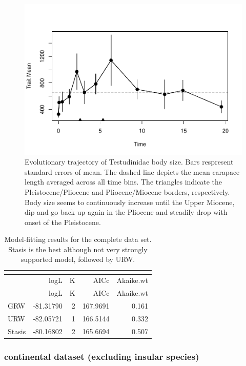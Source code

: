 \begin{figure}[H]
	\centering
	\includegraphics{MA_JJ_files/figure-latex/paleoTSAll-1.pdf}
	\caption[PaleoTS plot of complete data set]{Evolutionary trajectory of Testudinidae body size. Bars respresent standard errors of mean. The dashed line depicts the mean carapace length averaged across all time bins. The triangles indicate the Pleistocene/Pliocene and Pliocene/Miocene borders, respectively. Body size seems to continuously increase until the Upper Miocene, dip and go back up again in the Pliocene and steadily drop with onset of the Pleistocene.}
	\label{fig:pTSall}
\end{figure}

\begin{longtable}[]{@{}lrrrr@{}}
	\caption[Model fits for complete data set]{Model-fitting results for the complete data set. Stasis is the best although not very strongly supported model, followed by URW.}
	\label{tab:pTSallEM}\tabularnewline
	\toprule
	& logL & K & AICc & Akaike.wt\tabularnewline
	\midrule
	\endfirsthead
	\toprule
	& logL & K & AICc & Akaike.wt\tabularnewline
	\midrule
	\endhead
	GRW & -81.31790 & 2 & 167.9691 & 0.161\tabularnewline
	URW & -82.05721 & 1 & 166.5144 & 0.332\tabularnewline
	Stasis & -80.16802 & 2 & 165.6694 & 0.507\tabularnewline
	\bottomrule
\end{longtable}

\FloatBarrier

\subsubsection{continental dataset (excluding insular
	species)}\label{continental-excluding-insular-species}


